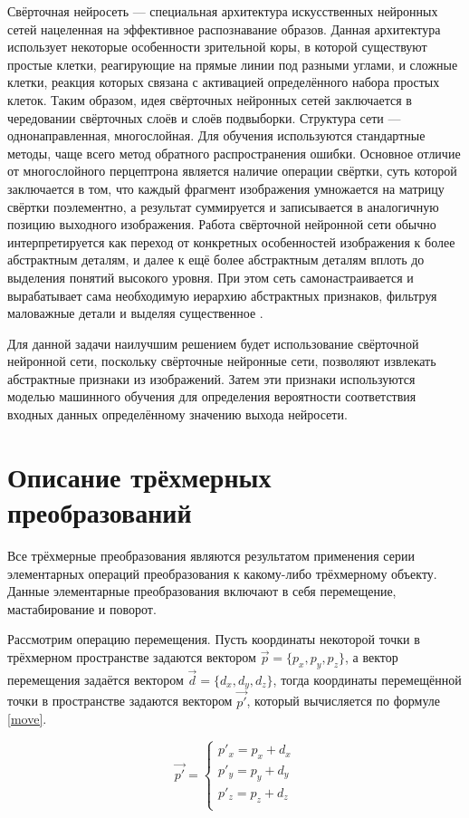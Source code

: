 Свёрточная нейросеть --- специальная архитектура искусственных нейронных сетей  нацеленная на эффективное распознавание образов. Данная архитектура использует некоторые особенности зрительной коры, в которой существуют простые клетки, реагирующие на прямые линии под разными углами, и сложные клетки, реакция которых связана с активацией определённого набора простых клеток. Таким образом, идея свёрточных нейронных сетей заключается в чередовании свёрточных слоёв и слоёв подвыборки. Структура сети — однонаправленная, многослойная. Для обучения используются стандартные методы, чаще всего метод обратного распространения ошибки. Основное отличие от многослойного перцептрона является наличие операции свёртки, суть которой заключается в том, что каждый фрагмент изображения умножается на матрицу свёртки поэлементно, а результат суммируется и записывается в аналогичную позицию выходного изображения. Работа свёрточной нейронной сети обычно интерпретируется как переход от конкретных особенностей изображения к более абстрактным деталям, и далее к ещё более абстрактным деталям вплоть до выделения понятий высокого уровня. При этом сеть самонастраивается и вырабатывает сама необходимую иерархию абстрактных признаков, фильтруя маловажные детали и выделяя существенное \cite{cnn}.

Для данной задачи наилучшим решением будет использование свёрточной нейронной сети, поскольку свёрточные нейронные сети, позволяют извлекать абстрактные признаки из изображений. Затем эти признаки используются моделью машинного обучения для определения вероятности соответствия входных данных определённому значению выхода нейросети.

\section{Описание трёхмерных преобразований}
Все трёхмерные преобразования являются результатом применения серии элементарных операций преобразования к какому-либо трёхмерному объекту. Данные элементарные преобразования включают в себя перемещение, мастабирование и поворот.

Рассмотрим операцию перемещения. Пусть координаты некоторой точки в трёхмерном пространстве задаются вектором $\overrightarrow{p} = \{p_{x}, p_{y}, p_{z}\}$, а вектор перемещения задаётся вектором $\overrightarrow{d} = \{d_{x}, d_{y}, d_{z}\}$, тогда координаты перемещённой точки в пространстве задаются вектором $\overrightarrow{p'}$, который вычисляется по формуле \ref{move}.

\begin{equation}\label{move} 
\overrightarrow{p'} = 
\begin{cases}
p'_{x} = p_{x} + d_{x}\\
p'_{y} = p_{y} + d_{y}\\
p'_{z} = p_{z} + d_{z}\\
\end{cases}
\end{equation}

